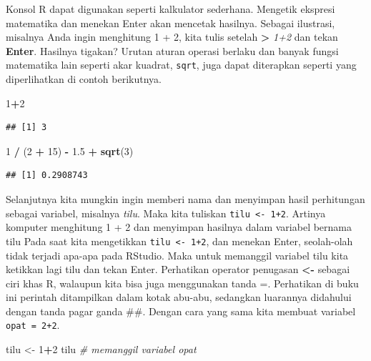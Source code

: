 \documentclass[a4paper, nobind]{templates/ociamthesis}
\newenvironment{Shaded}{\begin{snugshade}}{\end{snugshade}}
\newcommand{\CommentTok}[1]{\textcolor[rgb]{0.56,0.35,0.01}{\textit{#1}}}
\newcommand{\DecValTok}[1]{\textcolor[rgb]{0.00,0.00,0.81}{#1}}
\newcommand{\FloatTok}[1]{\textcolor[rgb]{0.00,0.00,0.81}{#1}}
\newcommand{\FunctionTok}[1]{\textcolor[rgb]{0.13,0.29,0.53}{\textbf{#1}}}
\newcommand{\NormalTok}[1]{#1}
\newcommand{\OtherTok}[1]{\textcolor[rgb]{0.56,0.35,0.01}{#1}}
\newcommand{\SpecialCharTok}[1]{\textcolor[rgb]{0.81,0.36,0.00}{\textbf{#1}}}
\renewenvironment{Shaded}
{
  \vspace{10pt}%
  \begin{snugshade}%
}{%
  \end{snugshade}%
  \vspace{8pt}%
}
\begin{document}
Konsol R dapat digunakan seperti kalkulator sederhana. Mengetik ekspresi matematika dan menekan Enter akan mencetak hasilnya. Sebagai ilustrasi, misalnya Anda ingin menghitung 1 + 2, kita tulis setelah \textbf{\textgreater{}} \emph{1+2} dan tekan \textbf{Enter}. Hasilnya tigakan? Urutan aturan operasi berlaku dan banyak fungsi matematika lain seperti akar kuadrat, \texttt{sqrt}, juga dapat diterapkan seperti yang diperlihatkan di contoh berikutnya.

\begin{Shaded}
\begin{Highlighting}[]
\DecValTok{1}\SpecialCharTok{+}\DecValTok{2}
\end{Highlighting}
\end{Shaded}

\begin{verbatim}
## [1] 3
\end{verbatim}

\begin{Shaded}
\begin{Highlighting}[]
\DecValTok{1} \SpecialCharTok{/}\NormalTok{ (}\DecValTok{2} \SpecialCharTok{+} \DecValTok{15}\NormalTok{) }\SpecialCharTok{{-}} \FloatTok{1.5} \SpecialCharTok{+} \FunctionTok{sqrt}\NormalTok{(}\DecValTok{3}\NormalTok{)}
\end{Highlighting}
\end{Shaded}

\begin{verbatim}
## [1] 0.2908743
\end{verbatim}

Selanjutnya kita mungkin ingin memberi nama dan menyimpan hasil perhitungan sebagai variabel, misalnya \emph{tilu}. Maka kita tuliskan \texttt{tilu\ \textless{}-\ 1+2}. Artinya komputer menghitung 1 + 2 dan menyimpan hasilnya dalam variabel bernama tilu Pada saat kita mengetikkan \texttt{tilu\ \textless{}-\ 1+2}, dan menekan Enter, seolah-olah tidak terjadi apa-apa pada RStudio. Maka untuk memanggil variabel tilu kita ketikkan lagi tilu dan tekan Enter. Perhatikan operator penugasan \textbf{\textless-} sebagai ciri khas R, walaupun kita bisa juga menggunakan tanda =. Perhatikan di buku ini perintah ditampilkan dalam kotak abu-abu, sedangkan luarannya didahului dengan tanda pagar ganda \#\#. Dengan cara yang sama kita membuat variabel \texttt{opat\ =\ 2+2}.

\begin{Shaded}
\begin{Highlighting}[]
\NormalTok{tilu }\OtherTok{\textless{}{-}} \DecValTok{1}\SpecialCharTok{+}\DecValTok{2}
\NormalTok{tilu }\CommentTok{\# memanggil variabel opat}
\end{Highlighting}
\end{Shaded}
\end{document}
